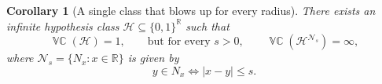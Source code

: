 \documentclass[11pt]{article}
\theoremstyle{plain}
\newtheorem{corollary}[theorem]{Corollary}
\theoremstyle{definition}
\theoremstyle{remark}
\DeclareMathOperator{\VCdim}{\mathbb{VC}}
\newcommand{\R}{\mathbb{R}}
\newcommand{\cF}{\mathcal{F}}
\begin{document}


\begin{corollary}[A single class that blows up for every radius]
\label{cor:pathology-1d}
There exists an infinite hypothesis class \(\mathcal H\subseteq\{0,1\}^{\R}\) such that
\[
\VCdim(\mathcal H)=1,
\qquad\text{but for every } s>0,\qquad
\VCdim(\mathcal H^{\mathcal N_s})=\infty,
\]
where \(\mathcal N_s=\{N_x:x\in\R\}\) is given by
\[
y\in N_x \iff |x-y|\le s.
\]
\end{corollary}
\end{document}
